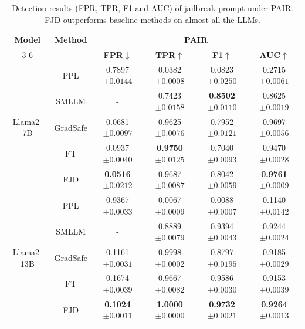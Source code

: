 \documentclass{article}
\begin{document}
\begin{table}[t]
  \caption{Detection results (FPR, TPR, F1 and AUC) of jailbreak prompt under PAIR. FJD outperforms baseline methods on almost all the LLMs.}
  \label{pair more}

  \centering
  \setlength\tabcolsep{14pt}
  \footnotesize

  \begin{tabular}{cccccc}
    \toprule
    \multirow{2}{*}{\textbf{Model}}  &  \multirow{2}{*}{\textbf{Method}} & \multicolumn{4}{c}{\textbf{PAIR}} \\
    \cmidrule(r){3-6}

    & & \textbf{FPR$\downarrow$}& \textbf{TPR$\uparrow$}& \textbf{F1$\uparrow$}&\textbf{AUC$\uparrow$}\\
    
    \midrule
    \multirow{5}{*}{Llama2-7B} 
    & PPL & 0.7897\tiny{$\pm 0.0144$} & 0.0382\tiny{$\pm 0.0008$} & 0.0823\tiny{$\pm 0.0250$} & 0.2715\tiny{$\pm 0.0061$} \\
    & SMLLM & - & 0.7423\tiny{$\pm 0.0158$} & \textbf{0.8502}\tiny{$\pm 0.0110$} & 0.8625\tiny{$\pm 0.0019$}  \\
    & GradSafe & 0.0681\tiny{$\pm 0.0097$} & 0.9625\tiny{$\pm 0.0076$} & 0.7952\tiny{$\pm 0.0121$} & 0.9697\tiny{$\pm 0.0056$} \\
    & FT & 0.0937\tiny{$\pm 0.0040$} & \textbf{0.9750}\tiny{$\pm 0.0125$} & 0.7040\tiny{$\pm 0.0093$} & 0.9470\tiny{$\pm 0.0028$} \\
    & FJD & \textbf{0.0516}\tiny{$\pm 0.0212$} & 0.9687\tiny{$\pm 0.0087$} & 0.8042\tiny{$\pm 0.0059$} & \textbf{0.9761}\tiny{$\pm 0.0009$}  \\
    \midrule
    \multirow{5}{*}{Llama2-13B} 
    & PPL & 0.9367\tiny{$\pm 0.0033$} & 0.0067\tiny{$\pm 0.0009$} & 0.0088\tiny{$\pm 0.0007$} & 0.1140\tiny{$\pm 0.0142$} \\
    & SMLLM & - & 0.8889\tiny{$\pm 0.0079$} & 0.9394\tiny{$\pm 0.0043$} & 0.9244\tiny{$\pm 0.0024$} \\
    & GradSafe & 0.1161\tiny{$\pm 0.0031$} & 0.9998\tiny{$\pm 0.0002$} & 0.8797\tiny{$\pm 0.0195$} & 0.9185\tiny{$\pm 0.0029$} \\
    & FT & 0.1674\tiny{$\pm 0.0039$} & 0.9667\tiny{$\pm 0.0082$} & 0.9586\tiny{$\pm 0.0030$} & 0.9153\tiny{$\pm 0.0039$} \\
    & FJD & \textbf{0.1024}\tiny{$\pm 0.0011$} & \textbf{1.0000}\tiny{$\pm 0.0000$} & \textbf{0.9732}\tiny{$\pm 0.0021$} & \textbf{0.9264}\tiny{$\pm 0.0013$} \\
    

\end{tabular}
\end{table}
\end{document}
